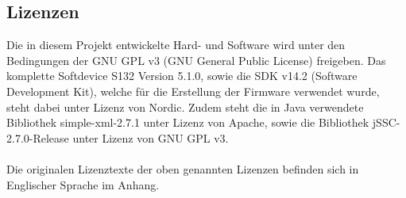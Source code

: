 \subsection{Lizenzen}

Die in diesem Projekt entwickelte Hard- und Software wird unter den Bedingungen der GNU GPL v3 (GNU General Public License) freigeben. Das komplette Softdevice S132 Version 5.1.0, sowie die SDK  v14.2 (Software Development Kit), welche für die Erstellung der Firmware verwendet wurde, steht dabei unter Lizenz von Nordic. Zudem steht die in Java verwendete Bibliothek simple-xml-2.7.1 unter Lizenz von Apache, sowie die Bibliothek jSSC-2.7.0-Release unter Lizenz von GNU GPL v3.\\
\\
Die originalen Lizenztexte der oben genannten Lizenzen befinden sich in Englischer Sprache im Anhang.